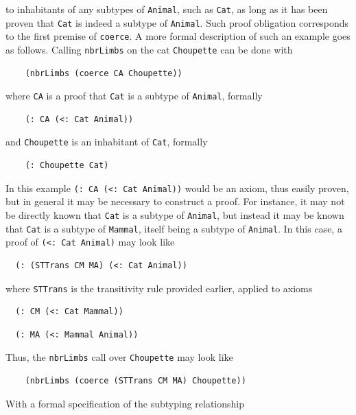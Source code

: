 \documentclass[]{report}
\begin{document}
\begin{enumerate}
  to inhabitants of any subtypes of \texttt{Animal}, such
  as \texttt{Cat}, as long as it has been proven that
  \texttt{Cat} is indeed a subtype of
  \texttt{Animal}.  Such proof obligation corresponds to
  the first premise of \texttt{coerce}.  A more formal
  description of such an example goes as follows.  Calling
  \texttt{nbrLimbs} on the cat
  \texttt{Choupette} can be done with
  \begin{verbatim}
    (nbrLimbs (coerce CA Choupette))
  \end{verbatim}
  where \texttt{CA} is a proof that
  \texttt{Cat} is a subtype of
  \texttt{Animal}, formally
  \begin{verbatim}
    (: CA (<: Cat Animal))
  \end{verbatim}
  and \texttt{Choupette} is an inhabitant of
  \texttt{Cat}, formally
  \begin{verbatim}
    (: Choupette Cat)
  \end{verbatim}
  In this example \texttt{(: CA (<: Cat Animal))} would be
  an axiom, thus easily proven, but in general it may be necessary to
  construct a proof.  For instance, it may not be directly known that
  \texttt{Cat} is a subtype of
  \texttt{Animal}, but instead it may be known that
  \texttt{Cat} is a subtype of
  \texttt{Mammal}, itself being a subtype of
  \texttt{Animal}.  In this case, a proof of
  \texttt{(<: Cat Animal)} may look like
  \begin{verbatim}
  (: (STTrans CM MA) (<: Cat Animal))
  \end{verbatim}
  where \texttt{STTrans} is the transitivity rule provided
  earlier, applied to axioms
  \begin{verbatim}
  (: CM (<: Cat Mammal))
  \end{verbatim}
  \begin{verbatim}
  (: MA (<: Mammal Animal))
  \end{verbatim}
  Thus, the \texttt{nbrLimbs} call over
  \texttt{Choupette} may look like
  \begin{verbatim}
    (nbrLimbs (coerce (STTrans CM MA) Choupette))
  \end{verbatim}
\end{enumerate}
With a formal specification of the subtyping relationship
\end{document}
